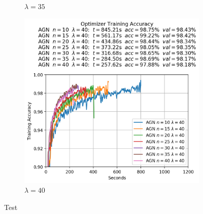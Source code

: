 \begin{figure}
\begin{subfigure}{.3\textwidth}
    \caption{$\lambda = 35$}
  \end{subfigure}
  \begin{subfigure}{.3\textwidth}
    \centering
    \includegraphics[width=\linewidth]{resources/images/agn_experiments_lambda_40}
    \caption{$\lambda = 40$}
  \end{subfigure}
  \label{fig:agn_experiments_lambdas}
  \caption{Test}
\end{figure}


